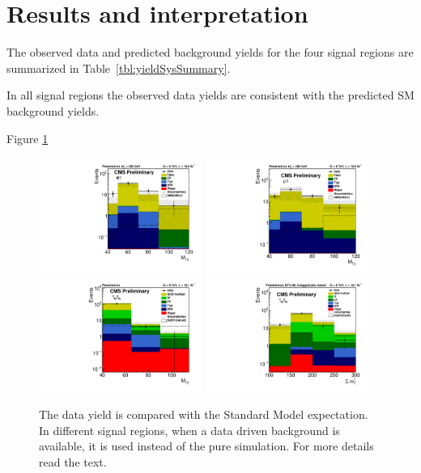 \section{Results and interpretation}
\label{sect:stat}
The observed data and predicted background yields for the four signal regions are summarized in Table~\ref{tbl:yieldSysSummary}. 

In all signal regions the observed data yields are consistent with the predicted SM background yields.

Figure \ref{fig:yield_final}
\begin{figure}[!Hhtb]
\centering
\includegraphics[width=0.475\textwidth,keepaspectratio=true]{StatisticsFig/MT2_tauMTgt200_DDFakeEleTau.pdf}
\includegraphics[width=0.475\textwidth,keepaspectratio=true]{StatisticsFig/MT2muTau_tauMTgt200_DDFake.pdf}
\includegraphics[width=0.475\textwidth,keepaspectratio=true]{StatisticsFig/QCDWestimation_bin1.pdf}
\includegraphics[width=0.475\textwidth,keepaspectratio=true]{StatisticsFig/QCDWestimation_bin2.pdf}
\caption{The data yield is compared with the Standard Model expectation. In different signal regions, 
when a data driven background is available, it is used instead of the pure simulation. For more details read the text.}
\label{fig:yield_final}
\end{figure}
